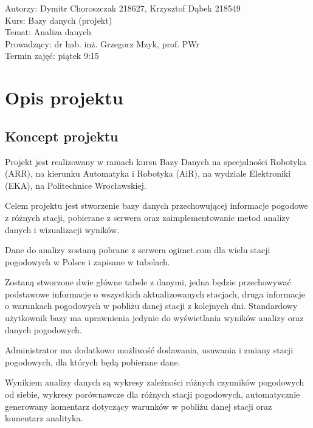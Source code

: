 \documentclass[12pt,a4paper]{article}
\begin{document}
\vspace{20pt}
 
\begin{flushleft}
Autorzy: Dymitr Choroszczak 218627, Krzysztof Dąbek 218549\\
Kurs: Bazy danych (projekt)\\
Temat: Analiza danych\\
Prowadzący: dr hab. inż. Grzegorz Mzyk, prof. PWr\\
Termin zajęć: piątek 9:15\\
\end{flushleft} 
 
\newpage
 
\tableofcontents
 
\newpage
 
\section{Opis projektu}
 
\subsection{Koncept projektu}
\normalsize
Projekt jest realizowany w ramach kursu Bazy Danych na specjalności Robotyka (ARR), na kierunku Automatyka i Robotyka (AiR), na wydziale Elektroniki (EKA), na Politechnice Wrocławskiej.\par
Celem projektu jest stworzenie bazy danych przechowującej informacje pogodowe z różnych stacji, pobierane z serwera oraz zaimplementowanie metod analizy danych i wizualizacji wyników.\par
Dane do analizy zostaną pobrane z serwera ogimet.com dla wielu stacji pogodowych w Polsce i zapisane w tabelach.\par
Zostaną stworzone dwie główne tabele z danymi, jedna będzie przechowywać podstawowe informacje o wszystkich aktualizowanych stacjach, druga informacje o warunkach pogodowych w pobliżu danej stacji z kolejnych dni.
Standardowy użytkownik bazy ma uprawnienia jedynie do wyświetlania wyników analizy oraz danych pogodowych.\par
Administrator ma dodatkowo możliwość dodawania, usuwania i zmiany stacji pogodowych, dla których będą pobierane dane.\par
Wynikiem analizy danych są wykresy zależności różnych czynników pogodowych od siebie, wykresy porównawcze dla różnych stacji pogodowych, automatycznie generowany komentarz dotyczący warunków w pobliżu danej stacji oraz komentarz analityka.
\newpage
\end{document}

